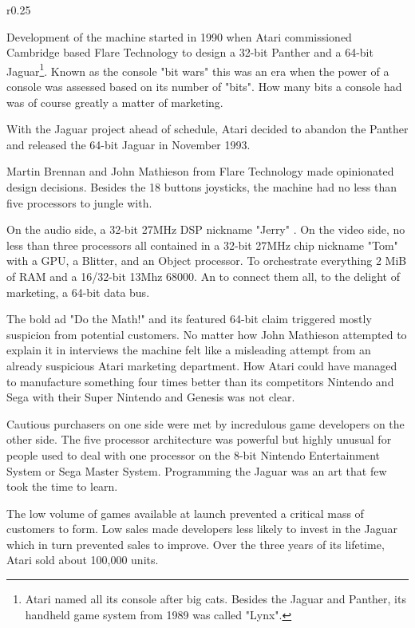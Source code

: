 \begin{wrapfigure}[4]{r}{0.25\textwidth}{\centering {}}
\end{wrapfigure}
Development of the machine started in 1990 when Atari commissioned Cambridge based Flare Technology to design a 32-bit Panther and a 64-bit Jaguar\footnote{Atari named all its console after big cats. Besides the Jaguar and Panther, its handheld game system from 1989 was called "Lynx".}. Known as the console "bit wars" this was an era when the power of a console was assessed based on its number of "bits". How many bits a console had was of course greatly a matter of marketing.\\
\par
With the Jaguar project ahead of schedule, Atari decided to abandon the Panther and released the 64-bit Jaguar in November 1993.\\
\par
{}
\par
Martin Brennan and John Mathieson from Flare Technology made opinionated design decisions. Besides the 18 buttons joysticks, the machine had no less than five processors to jungle with.\\
\par
On the audio side, a 32-bit 27MHz DSP nickname "Jerry" . On the video side, no less than three processors all contained in a 32-bit 27MHz chip nickname "Tom" with a GPU, a Blitter, and an Object processor. To orchestrate everything 2 MiB of RAM and a 16/32-bit 13Mhz 68000. An to connect them all, to the delight of marketing, a 64-bit data bus.\\
\par
The bold ad "Do the Math!" and its featured 64-bit claim triggered mostly suspicion from potential customers.  No matter how John Mathieson attempted to explain it in interviews the machine felt like a misleading attempt from an already suspicious Atari marketing department. How Atari could have managed to manufacture something four times better than its competitors Nintendo and Sega with their Super Nintendo and Genesis was not clear.
\par
Cautious purchasers on one side were met by incredulous game developers on the other side. The five processor architecture was powerful but highly unusual for people used to deal with one processor on the 8-bit Nintendo Entertainment System or Sega Master System. Programming the Jaguar was an art that few took the time to learn.\\
\par
The low volume of games available at launch prevented a critical mass of customers to form. Low sales made developers less likely to invest in the Jaguar which in turn prevented sales to improve. Over the three years of its lifetime, Atari sold about 100,000 units. 


